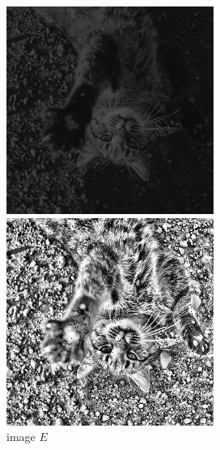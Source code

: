 \documentclass[12pt,a4paper,notitlepage,oneside,amsmath,amssymb]{article}
\begin{document}
\begin{CJK*}{UTF8}{bkai}
\begin{enumerate}[label=(\alph*)]
\begin{figure}[hbt!]
\begin{minipage}{.25\textwidth}
              \includegraphics[width=.95\linewidth]{imageE}
              \caption*{image \(E\)}
            \end{minipage}%
            \begin{minipage}{.25\textwidth}
              \centering
              \includegraphics[width=.95\linewidth]{image_LD}

\end{minipage}
\end{figure}
\end{enumerate}
\end{CJK*}
\end{document}
